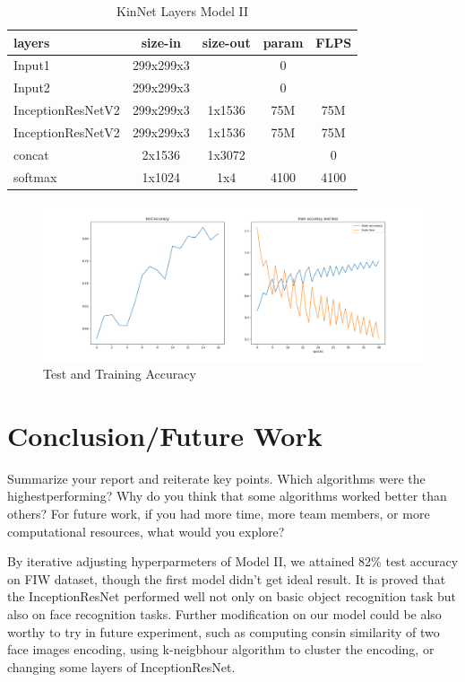 \documentclass{article}
\begin{document}
\begin{table}[h]
	\centering
	\begin{tabular}{ | l | c | c | c | c |}
		\hline
		\textbf{layers}&\textbf{size-in}&\textbf{size-out}&\textbf{param}&\textbf{FLPS}\\
		\hline
			Input1 & 299x299x3 & & 0 & \\
			Input2 & 299x299x3 & & 0 & \\
			InceptionResNetV2 & 299x299x3 & 1x1536 & 75M & 75M \\
			InceptionResNetV2 & 299x299x3 & 1x1536 & 75M & 75M \\
			concat & 2x1536 & 1x3072 & & 0 \\
			softmax & 1x1024 & 1x4 & 4100 & 4100 \\
		\hline
	\end{tabular}
	\caption{KinNet Layers Model II}
	\label{table:3}
\end{table}


\begin{figure}[h]
	\caption{Test and Training Accuracy}
	\includegraphics[width=1\textwidth]{img/loss_accuracy}
	\centering
\end{figure}

\section{Conclusion/Future Work }
Summarize your report and reiterate key points. Which algorithms were the highestperforming?
Why do you think that some algorithms worked better than others? For
future work, if you had more time, more team members, or more computational resources,
what would you explore?

By iterative adjusting hyperparmeters of Model II, we attained 82\% test
accuracy on FIW dataset, though the first model didn't get ideal result. It is
proved that the InceptionResNet performed well not only on basic object
recognition task but also on face recognition tasks. Further modification on
our model could be also worthy to try in future experiment, such as computing
consin similarity of two face images encoding, using k-neigbhour algorithm to
cluster the encoding, or changing some layers of InceptionResNet.
\end{document}

